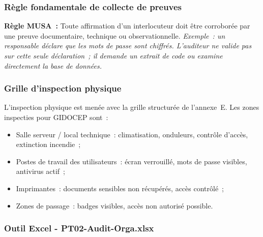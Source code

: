 \documentclass[12pt,a4paper,oneside]{report}
\begin{document}
\subsubsection{R\`egle fondamentale de collecte de preuves}

\begin{goldbox}
\textbf{R\`egle MUSA~:} Toute affirmation d'un interlocuteur doit \^etre
corrobor\'ee par une preuve documentaire, technique ou observationnelle.
\textit{Exemple~: un responsable d\'eclare que les mots de passe sont chiffr\'es.
L'auditeur ne valide pas sur cette seule d\'eclaration~; il demande un extrait
de code ou examine directement la base de donn\'ees.}
\end{goldbox}

\subsubsection{Grille d'inspection physique}

L'inspection physique est men\'ee avec la grille structur\'ee de l'annexe~E.
Les zones inspecties pour GIDOCEP sont~:

\begin{itemize}[label={\color{gold}}, leftmargin=*, itemsep=2pt]
\item Salle serveur / local technique~: climatisation, onduleurs, contr\^ole
  d'acc\`es, extinction incendie~;
\item Postes de travail des utilisateurs~: \'ecran verrouill\'e, mots de passe
  visibles, antivirus actif~;
\item Imprimantes~: documents sensibles non r\'ecup\'er\'es, acc\`es contr\^ol\'e~;
\item Zones de passage~: badges visibles, acc\`es non autoris\'e possible.
\end{itemize}

\subsubsection{Outil Excel - PT02-Audit-Orga.xlsx}
\end{document}
